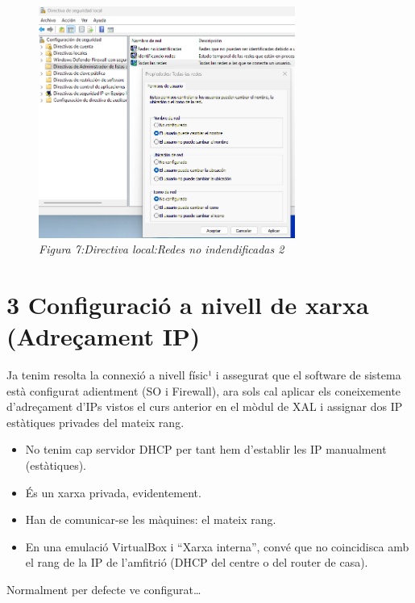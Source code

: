 \documentclass[
  a4paper,
]{article}
\providecommand{\tightlist}{%
  \setlength{\itemsep}{0pt}\setlength{\parskip}{0pt}}
\begin{document}
\begin{figure}
\centering
\includegraphics[width=0.75\textwidth,height=\textheight]{png/secpolRedesNoIdentificadas2.png}
\caption{\emph{Figura 7:Directiva local:Redes no indendificadas 2}}
\end{figure}

\section{3 Configuració a nivell de xarxa (Adreçament
IP)}\label{configuraciuxf3-a-nivell-de-xarxa-adreuxe7ament-ip}

Ja tenim resolta la connexió a nivell físic¹ i assegurat que el software
de sistema està configurat adientment (SO i Firewall), ara sols cal
aplicar els coneixemente d'adreçament d'IPs vistos el curs anterior en
el mòdul de XAL i assignar dos IP estàtiques privades del mateix rang.

\begin{itemize}
\tightlist
\item
  No tenim cap servidor DHCP per tant hem d'establir les IP manualment
  (estàtiques).
\item
  És un xarxa privada, evidentement.
\item
  Han de comunicar-se les màquines: el mateix rang.
\item
  En una emulació VirtualBox i ``Xarxa interna'', convé que no
  coincidisca amb el rang de la IP de l'amfitrió (DHCP del centre o del
  router de casa).
\end{itemize}

Normalment per defecte ve configurat\ldots{}
\end{document}

